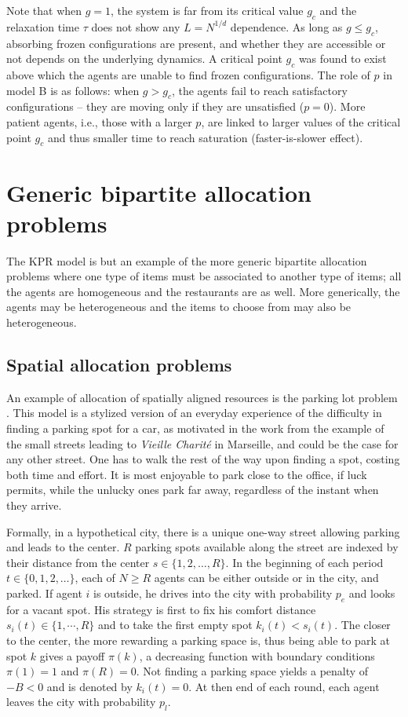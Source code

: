 \documentclass[aps,twocolumn,nofootinbib,sortedaddress,reprint]{revtex4-1}
\begin{document}
Note that when $g = 1$, the system is far from its critical value $g_c$ and the relaxation
time $\tau$ does not show any $L = N^{1/d}$ dependence.  As long as
$g\le g_c$, absorbing frozen configurations are present, and whether
they are accessible or not depends on the underlying dynamics.
A critical point $g_c$ was found to exist above which the agents are
unable to find frozen configurations.
The role of $p$ in model B is as follows:  when $g>g_c$, the agents fail to reach satisfactory
configurations -- they are moving only if they
are unsatisfied ($p=0$). More patient agents, i.e., those with a larger $p$, are linked to larger
 values of the critical point $g_c$ and thus
smaller time to reach saturation (faster-is-slower effect).


\section{Generic bipartite allocation problems}
\label{sec:bipartite}
The KPR model is but an example of the more generic bipartite
allocation problems where one type of items must be associated to
another type of items; all the agents are homogeneous and the
restaurants are as well. More generically, the agents may be
heterogeneous and the items to choose from may also be heterogeneous.

\subsection{Spatial allocation problems}



An example of allocation of spatially aligned resources is the parking
lot problem \cite{Hanaki2011}. This model is a stylized version of an everyday experience of
  the difficulty in finding a parking spot for a car, as motivated in
  the work from the example of the small streets leading to
  \textit{Vieille Charit\'{e}} in Marseille, and could be the case for
  any other street.  One has to walk the rest of the way
upon finding a spot, costing both time and effort.  It is most enjoyable to
park close to the office, if luck permits, while the unlucky ones park
far away, regardless of the instant when they arrive.


Formally, in a hypothetical city, there is a unique one-way street allowing
parking and leads to the center.
$R$ parking spots available along the street are indexed by their distance from the center
$s \in \{1,2, \ldots, R \}$.  In the beginning of each period $t \in
\{0,1,2, \ldots \}$, each of $N \ge R$  agents can be either
outside or in the city, and parked. If agent $i$ is outside,
he drives into the city with probability $p_e$ and looks for a
vacant spot. His strategy  is first to fix his comfort distance  $s_i(t)\in\{1,\cdots,R\}$ and to take the first empty spot $k_i(t)<s_i(t)$. The closer to the center, the more rewarding a parking space is, thus being able to park at spot $k$ gives a payoff $\pi(k)$,  a decreasing function with boundary conditions $\pi(1)=1$ and $\pi(R)=0$.  Not finding a parking space yields a penalty of $-B<0$ and is denoted by $k_i(t)=0$. At then end of each round, each agent leaves the city
with probability $p_l$.
\end{document}
